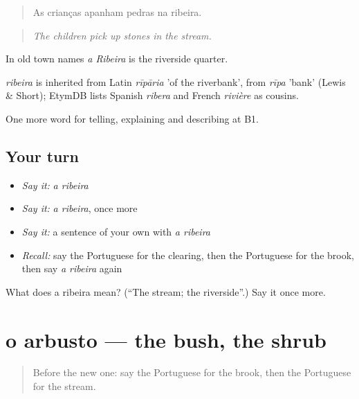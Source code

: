 \begin{quote}
As crianças apanham pedras na ribeira.
\end{quote}

\begin{quote}
\emph{The children pick up stones in the stream.}
\end{quote}

In old town names \emph{a Ribeira} is the riverside quarter.

\begin{cousinweb}
\emph{ribeira} is inherited from Latin \emph{rīpāria} 'of the riverbank', from \emph{rīpa} 'bank' (Lewis \& Short); EtymDB lists Spanish \emph{ribera} and French \emph{rivière} as cousins.
\end{cousinweb}

\begin{grammarlens}[title={What you've built}]
One more word for telling, explaining and describing at B1.
\end{grammarlens}

\subsection*{Your turn}
\begin{itemize}
\raggedright
  \item \emph{Say it:} \emph{a ribeira}
  \item \emph{Say it:} \emph{a ribeira}, once more
  \item \emph{Say it:} a sentence of your own with \emph{a ribeira}
  \item \emph{Recall:} say the Portuguese for the clearing, then the Portuguese for the brook, then say \emph{a ribeira} again
\end{itemize}

\begin{tcolorbox}[breakable,colback=teal!4,colframe=teal!35!black,title={Before you move on}]
What does a ribeira mean? (\textquotedblleft{}The stream; the riverside\textquotedblright{}.) Say it once more.
\end{tcolorbox}
\section[o arbusto]{o arbusto — the bush, the shrub}

\label{lesson:PT-C456-arbusto}



\begin{quote}
Before the new one: say the Portuguese for the brook, then the Portuguese for the stream.
\end{quote}

